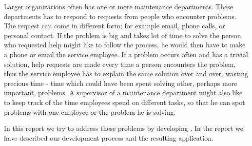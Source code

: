 Larger organizations often has one or more maintenance departments.
These departments has to respond to requests from people who encounter problems. 
The request can come in different form; for example email, phone calls, or personal contact. 
If the problem is big and takes lot of time to solve the person who requested help might like to follow the process, he would then have to make a phone or email the service employee. 
If a problem occurs often and has a trivial solution, help requests are made every time a person encounters the problem, thus the service employee has to explain the same solution over and over, wasting precious time - time which could have been spent solving other, perhaps more important, problems. A supervisor of a maintenance department might also like to keep track of the time employees spend on different tasks, so that he can spot problems with one employee or the problem he is solving.

In this report we try to address these problems by developing \hdesk. In the report we have described our development process and the resulting application.